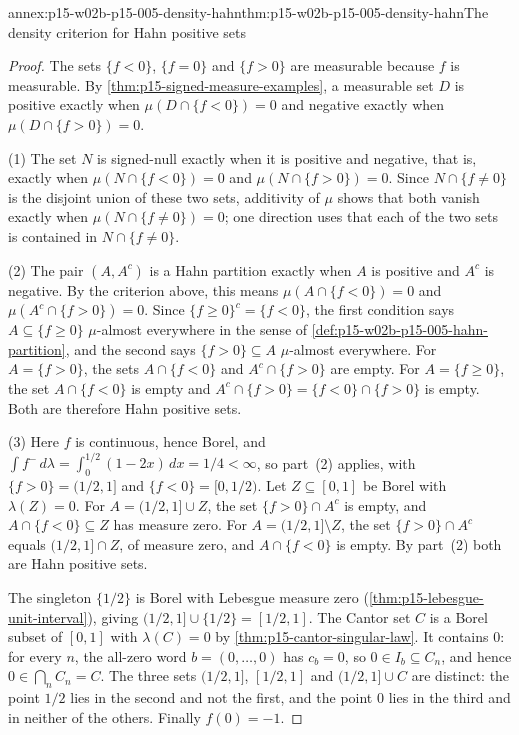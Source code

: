 \begin{annexitem}{annex:p15-w02b-p15-005-density-hahn}{thm:p15-w02b-p15-005-density-hahn}{The density criterion for Hahn positive sets}
\begin{proof}
The sets \(\{f<0\}\), \(\{f=0\}\) and \(\{f>0\}\) are measurable
because \(f\) is measurable. By \cref{thm:p15-signed-measure-examples},
a measurable set \(D\) is positive exactly when
\(\mu(D\cap\{f<0\})=0\) and negative exactly when
\(\mu(D\cap\{f>0\})=0\).

(1) The set \(N\) is signed-null exactly when it is positive and
negative, that is, exactly when
\(\mu(N\cap\{f<0\})=0\) and \(\mu(N\cap\{f>0\})=0\). Since
\(N\cap\{f\neq0\}\) is the disjoint union of these two sets, additivity
of \(\mu\) shows that both vanish exactly when
\(\mu(N\cap\{f\neq0\})=0\); one direction uses that each of the two
sets is contained in \(N\cap\{f\neq0\}\).

(2) The pair \((A,A^c)\) is a Hahn partition exactly when \(A\) is
positive and \(A^c\) is negative. By the criterion above, this means
\(\mu(A\cap\{f<0\})=0\) and \(\mu(A^c\cap\{f>0\})=0\). Since
\(\{f\geq0\}^c=\{f<0\}\), the first condition says
\(A\subseteq\{f\geq0\}\) \(\mu\)-almost everywhere in the sense of
\cref{def:p15-w02b-p15-005-hahn-partition}, and the second says
\(\{f>0\}\subseteq A\) \(\mu\)-almost everywhere. For \(A=\{f>0\}\),
the sets \(A\cap\{f<0\}\) and \(A^c\cap\{f>0\}\) are empty. For
\(A=\{f\geq0\}\), the set \(A\cap\{f<0\}\) is empty and
\(A^c\cap\{f>0\}=\{f<0\}\cap\{f>0\}\) is empty. Both are therefore Hahn
positive sets.

(3) Here \(f\) is continuous, hence Borel, and
\(\int f^-\,d\lambda=\int_0^{1/2}(1-2x)\,dx=1/4<\infty\), so part~(2)
applies, with \(\{f>0\}=(1/2,1]\) and \(\{f<0\}=[0,1/2)\). Let
\(Z\subseteq[0,1]\) be Borel with \(\lambda(Z)=0\).
For \(A=(1/2,1]\cup Z\), the set \(\{f>0\}\cap A^c\) is empty, and
\(A\cap\{f<0\}\subseteq Z\) has measure zero.
For \(A=(1/2,1]\setminus Z\), the set \(\{f>0\}\cap A^c\) equals
\((1/2,1]\cap Z\), of measure zero, and \(A\cap\{f<0\}\) is empty.
By part~(2) both are Hahn positive sets.

The singleton \(\{1/2\}\) is Borel with Lebesgue measure zero
(\cref{thm:p15-lebesgue-unit-interval}), giving
\((1/2,1]\cup\{1/2\}=[1/2,1]\). The Cantor set \(C\) is a Borel subset
of \([0,1]\) with \(\lambda(C)=0\) by
\cref{thm:p15-cantor-singular-law}. It contains \(0\): for every
\(n\), the all-zero word \(b=(0,\ldots,0)\) has \(c_b=0\), so
\(0\in I_b\subseteq C_n\), and hence \(0\in\bigcap_nC_n=C\).
The three sets \((1/2,1]\), \([1/2,1]\) and \((1/2,1]\cup C\) are
distinct: the point \(1/2\) lies in the second and not the first, and
the point \(0\) lies in the third and in neither of the others. Finally
\(f(0)=-1\).
\end{proof}
\end{annexitem}

